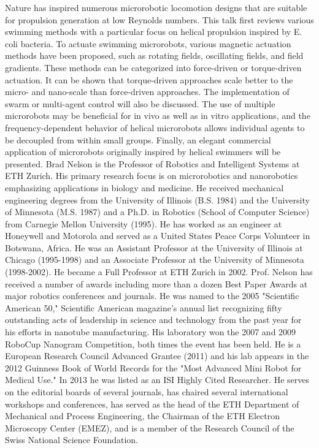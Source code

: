 {
Nature has inspired numerous microrobotic locomotion designs that are suitable for propulsion generation at low Reynolds numbers. This talk first reviews various swimming methods with a particular focus on helical propulsion inspired by E. coli bacteria. To actuate swimming microrobots, various magnetic actuation methods have been proposed, such as rotating fields, oscillating fields, and field gradients. These methods can be categorized into force-driven or torque-driven actuation. It can be shown that torque-driven approaches scale better to the micro- and nano-scale than force-driven approaches. The implementation of swarm or multi-agent control will also be discussed. The use of multiple microrobots may be beneficial for in vivo as well as in vitro applications, and the frequency-dependent behavior of helical microrobots allows individual agents to be decoupled from within small groups. Finally, an elegant commercial application of microrobots originally inspired by helical swimmers will be presented.
}{
Brad Nelson is the Professor of Robotics and Intelligent Systems at ETH Zurich. His primary research focus is on microrobotics and nanorobotics emphasizing applications in biology and medicine. He received mechanical engineering degrees from the University of Illinois (B.S. 1984) and the University of Minnesota (M.S. 1987) and a Ph.D. in Robotics (School of Computer Science) from Carnegie Mellon University (1995). He has worked as an engineer at Honeywell and Motorola and served as a United States Peace Corps Volunteer in Botswana, Africa. He was an Assistant Professor at the University of Illinois at Chicago (1995-1998) and an Associate Professor at the University of Minnesota (1998-2002). He became a Full Professor at ETH Zurich in 2002. Prof. Nelson has received a number of awards including more than a dozen Best Paper Awards at major robotics conferences and journals. He was named to the 2005 "Scientific American 50," Scientific American magazine's annual list recognizing fifty outstanding acts of leadership in science and technology from the past year for his efforts in nanotube manufacturing. His laboratory won the 2007 and 2009 RoboCup Nanogram Competition, both times the event has been held. He is a European Research Council Advanced Grantee (2011) and his lab appears in the 2012 Guinness Book of World Records for the "Most Advanced Mini Robot for Medical Use." In 2013 he was listed as an ISI Highly Cited Researcher. He serves on the editorial boards of several journals, has chaired several international workshops and conferences, has served as the head of the ETH Department of Mechanical and Process Engineering, the Chairman of the ETH Electron Microscopy Center (EMEZ), and is a member of the Research Council of the Swiss National Science Foundation.
}


